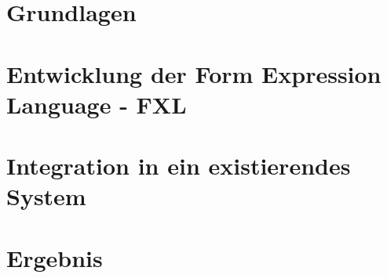 \documentclass [11pt,smallheadings, a4paper]{report}
\begin{document}




\part{Grundlagen}
\label{part_grundlagen}


\part{Entwicklung der Form Expression Language - FXL}
\label{part_entwicklung}


\part{Integration in ein existierendes System}
\label{part_integration}


\part{Ergebnis}
\label{part_ergebnis}




%



\begin{flushleft}


\end{flushleft}


\listoftables
\listoffigures
\lstlistoflistings

\appendix

\end{document}
